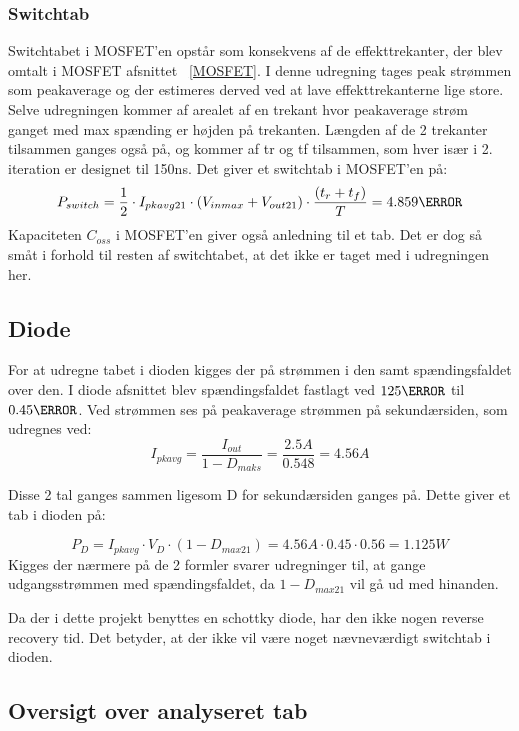 \subsubsection{Switchtab}
Switchtabet i MOSFET'en opstår som konsekvens af de effekttrekanter, der blev omtalt i MOSFET afsnittet ~\ref{MOSFET}. I denne udregning tages peak strømmen som peakaverage og der estimeres derved ved at lave effekttrekanterne lige store. Selve udregningen kommer af arealet af en trekant hvor peakaverage strøm ganget med max spænding er højden på trekanten. Længden af de 2 trekanter tilsammen ganges også på, og kommer af tr og tf tilsammen, som hver især i 2. iteration er designet til 150ns. Det giver et switchtab i MOSFET'en på:
 \begin{equation} \label{P_switch}
 P_{switch} = \frac{1}{2} \cdot I_{pkavg21} \cdot (V_{inmax}+V_{out21}) \cdot \frac{(t_r+t_f)}{T}= 4.859\watt
 \end{equation} 
Kapaciteten $C_{oss}$ i MOSFET'en giver også anledning til et tab. Det er dog så småt i forhold til resten af switchtabet, at det ikke er taget med i udregningen her. 

\subsection{Diode}
For at udregne tabet i dioden kigges der på strømmen i den samt spændingsfaldet over den. I diode afsnittet blev spændingsfaldet fastlagt ved $125\degreeCelsius$ til $0.45\ohm$. Ved strømmen ses på peakaverage strømmen på sekundærsiden, som udregnes ved:
\begin{equation} \label{I_pk_avg}
I_{pkavg} = \frac{I_{out}}{1-D_{maks}} = \frac{2.5A}{0.548} = 4.56A
\end{equation}

Disse 2 tal ganges sammen ligesom D for sekundærsiden ganges på. Dette giver et tab i dioden på:

\begin{equation} \label{diodetab}
P_D = I_{pkavg} \cdot V_D \cdot (1-D_{max21}) = 4.56A \cdot 0.45 \cdot 0.56 = 1.125W 
\end{equation}  
Kigges der nærmere på de 2 formler svarer udregninger til, at gange udgangsstrømmen med spændingsfaldet, da $1-D_{max21}$ vil gå ud med hinanden.

Da der i dette projekt benyttes en schottky diode, har den ikke nogen reverse recovery tid. Det betyder, at der ikke vil være noget nævneværdigt switchtab i dioden. 

\subsection{Oversigt over analyseret tab}

